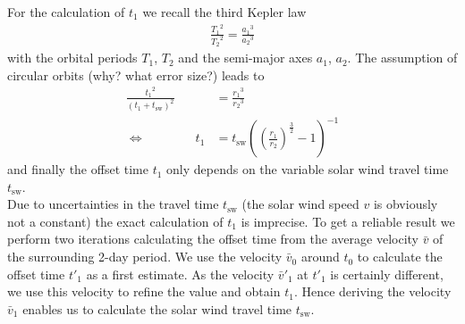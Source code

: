 For the calculation of $t_1$ we recall the third Kepler law
\begin{align}
	\frac{{T_1}^2}{{T_2}^2} = \frac{{a_1}^3}{{a_2}^3}
\end{align}
with the orbital periods $T_1$, $T_2$ and the semi-major axes $a_1$, $a_2$. The assumption of circular orbits (why? what error size?) leads to
\begin{align}
	\frac{{t_1}^2}{(t_1 + t_\text{sw})^2} &= \frac{{r_1}^3}{{r_2}^3}	\nonumber\\
	\Leftrightarrow\qquad\qquad	t_1 &= t_\text{sw} \left( \left( \frac{r_1}{r_2} \right)^\frac{3}{2} - 1 \right)^{-1} \label{eq:offset_time}
\end{align}
and finally the offset time $t_1$ only depends on the variable solar wind travel time $t_\text{sw}$.\\

Due to uncertainties in the travel time $t_\text{sw}$ (the solar wind speed $v$ is obviously not a constant) the exact calculation of $t_1$ is imprecise. To get a reliable result we perform two iterations calculating the offset time from the average velocity $\bar{v}$ of the surrounding 2-day period. We use the velocity $\bar{v}_0$ around $t_0$ to calculate the offset time $t'_1$ as a first estimate. As the velocity $\bar{v}'_1$ at $t'_1$ is certainly different, we use this velocity to refine the value and obtain $t_1$. Hence deriving the velocity $\bar{v}_1$ enables us to calculate the solar wind travel time $t_\text{sw}$.

